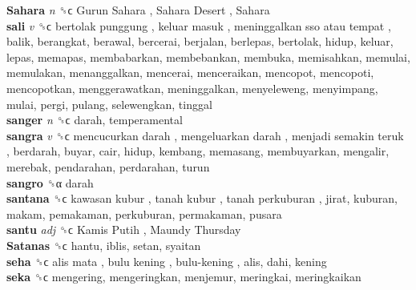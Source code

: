 \textbf{Sahara} \emph{n}  ␝ϲ   Gurun Sahara ,  Sahara Desert ,  Sahara   \\
\textbf{sali} \emph{v}  ␝ϲ   bertolak punggung ,  keluar masuk ,  meninggalkan sso atau tempat , balik, berangkat, berawal, bercerai, berjalan, berlepas, bertolak, hidup, keluar, lepas, memapas, membabarkan, membebankan, membuka, memisahkan, memulai, memulakan, menanggalkan, mencerai, menceraikan, mencopot, mencopoti, mencopotkan, menggerawatkan, meninggalkan, menyeleweng, menyimpang, mulai, pergi, pulang, selewengkan, tinggal  \\
\textbf{sanger} \emph{n}  ␝ϲ  darah, temperamental  \\
\textbf{sangra} \emph{v}  ␝ϲ   mencucurkan darah ,  mengeluarkan darah ,  menjadi semakin teruk , berdarah, buyar, cair, hidup, kembang, memasang, membuyarkan, mengalir, merebak, pendarahan, perdarahan, turun  \\
\textbf{sangro} ␝α  darah  \\
\textbf{santana} ␝ϲ   kawasan kubur ,  tanah kubur ,  tanah perkuburan , jirat, kuburan, makam, pemakaman, perkuburan, permakaman, pusara  \\
\textbf{santu} \emph{adj}  ␝ϲ   Kamis Putih ,  Maundy Thursday   \\
\textbf{Satanas} ␝ϲ  hantu, iblis, setan, syaitan  \\
\textbf{seha} ␝ϲ   alis mata ,  bulu kening ,  bulu-kening , alis, dahi, kening  \\
\textbf{seka} ␝ϲ  mengering, mengeringkan, menjemur, meringkai, meringkaikan  \\
